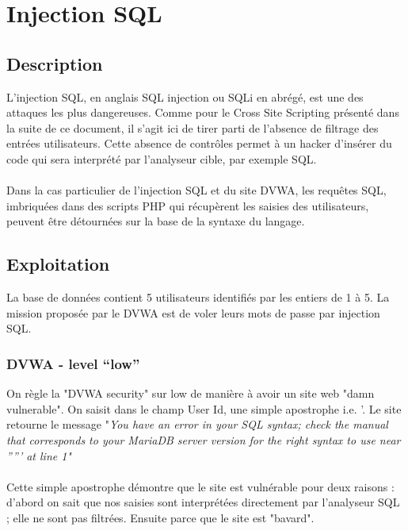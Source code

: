 
\newpage
\section{Injection SQL }


\subsection{Description}
L'injection SQL, en anglais SQL  injection ou SQLi en abrégé, est une des attaques les plus dangereuses. Comme pour le Cross Site Scripting présenté dans la suite de ce document, il s'agit ici de tirer parti de l'absence de filtrage des entrées utilisateurs. Cette absence de contrôles permet à un hacker d'insérer du code qui sera interprété par l'analyseur cible, par exemple SQL.

\paragraph{}
Dans la cas particulier de l'injection SQL et du site DVWA, les requêtes SQL, imbriquées dans des scripts PHP qui récupèrent les saisies des utilisateurs, peuvent être détournées sur la base de la syntaxe du langage.




\subsection{Exploitation}

La base de données contient 5 utilisateurs identifiés par les entiers de 1 à 5.
La mission proposée par le DVWA est de voler leurs mots de passe par injection SQL.


\subsubsection{DVWA - level “low”}

On règle la "DVWA security" sur low de manière à avoir un site web "damn vulnerable".
On saisit dans le champ User Id, une simple apostrophe i.e. '. Le site retourne le message
"\it {You have an error in your SQL syntax; check the manual that corresponds to your MariaDB server version for the right syntax to use near ''''' at line 1}"

\paragraph{}Cette simple apostrophe démontre que le site est vulnérable pour deux raisons : d'abord on sait que nos saisies sont interprétées directement par l'analyseur SQL ; elle ne sont pas filtrées. Ensuite parce que le site est "bavard".

